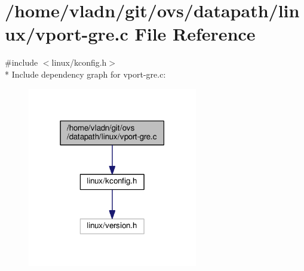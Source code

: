 \hypertarget{linux_2vport-gre_8c}{}\section{/home/vladn/git/ovs/datapath/linux/vport-\/gre.c File Reference}
\label{linux_2vport-gre_8c}
{\ttfamily \#include $<$linux/kconfig.\+h$>$}\\*
Include dependency graph for vport-\/gre.c\+:
\nopagebreak
\begin{figure}[H]
\begin{center}
\leavevmode
\includegraphics[width=210pt]{linux_2vport-gre_8c__incl}
\end{center}
\end{figure}
